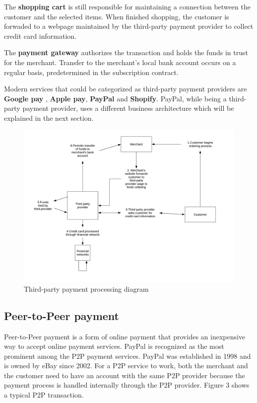 \documentclass{ferseminar}
\begin{document}
The \textbf{shopping cart} is still responsible for maintaining a connection between the customer and the selected items. When finished shopping, the customer is forwaded to a webpage maintained by the third-party payment provider to collect credit card information.

The \textbf{payment gateway} authorizes the transaction and holds the funds in trust for the merchant. Transfer to the merchant's local bank account occurs on a regular basis, predetermined in the subscription contract.

Modern services that could be categorized as third-party payment providers are \textbf{Google pay} \cite{Google}, \textbf{Apple pay}, \textbf{PayPal} and \textbf{Shopify}. PayPal, while being a third-party payment provider, uses a different business architecture which will be explained in the next section.

\begin{figure}[ht]
	\caption{Third-party payment processing diagram}
	\includegraphics[scale=0.26]{diagram2}
	\centering
\end{figure}
\FloatBarrier

\subsection{Peer-to-Peer payment}

Peer-to-Peer payment is a form of online payment that provides an inexpensive way to accept online payment services. PayPal is recognized as the most prominent among the P2P payment services. PayPal was established in 1998 and is owned by eBay since 2002. For a P2P service to work, both the merchant and the customer need to have an account with the same P2P provider because the payment process is handled internally through the P2P provider. Figure 3 shows a typical P2P transaction.
\end{document}
